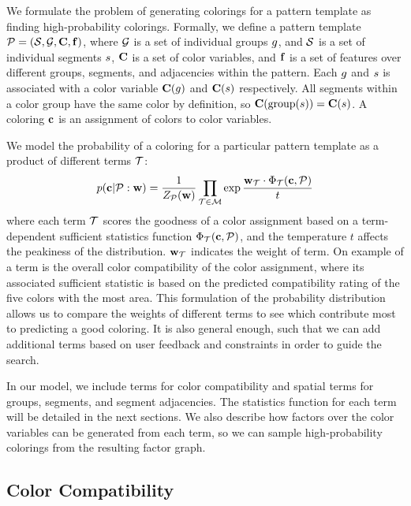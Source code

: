 We formulate the problem of generating colorings for a pattern template as finding high-probability colorings. Formally, we define a pattern template $\mathcal{P} = (\mathcal{S}, \mathcal{G}, \mathbf{C}, \mathbf{f})$, where $\mathcal{G}$ is a set of individual groups $g$, and $\mathcal{S}$ is a set of individual segments $s$, $\mathbf{C}$ is a set of color variables, and $\mathbf{f}$ is a set of features over different groups, segments, and adjacencies within the pattern. Each $g$ and $s$ is associated with a color variable $\mathbf{C}(g)$ and $\mathbf{C}(s)$ respectively. All segments within a color group have the same color by definition, so $\mathbf{C}(\text{group}(s)) = \mathbf{C}(s)$. A coloring $\mathbf{c}$ is an assignment of colors to color variables.

We model the probability of a coloring for a particular pattern template as a product of different terms $\mathcal{T}$:   
\begin{equation*}
 p(\mathbf{c} | \mathcal{P} : \mathbf{w}) = \frac{1}{Z_{\mathcal{P}}(\mathbf{w})} \prod_{\mathcal{T} \in \mathcal{M}} \exp{\frac{ \mathbf{w}_{\mathcal{T}}\cdot \Phi_{\mathcal{T}}(\mathbf{c}, \mathcal{P})}{t}}
\end{equation*}
where each term $\mathcal{T}$ scores the goodness of a color assignment based on a term-dependent sufficient statistics function $\Phi_{\mathcal{T}}(\mathbf{c},\mathcal{P})$, and the temperature $t$ affects the peakiness of the distribution. $\mathbf{w}_{\mathcal{T}}$ indicates the weight of term. On example of a term is the overall color compatibility of the color assignment, where its associated sufficient statistic is based on the predicted compatibility rating of the five colors with the most area. This formulation of the probability distribution allows us to compare the weights of different terms to see which contribute most to predicting a good coloring. It is also general enough, such that we can add additional terms based on user feedback and constraints in order to guide the search.

In our model, we include terms for color compatibility and spatial terms for groups, segments, and segment adjacencies. The statistics function for each term will be detailed in the next sections. We also describe how factors over the color variables can be generated from each term, so we can sample high-probability colorings from the resulting factor graph.

\subsection{Color Compatibility}
\label{sec:colorCompat}

